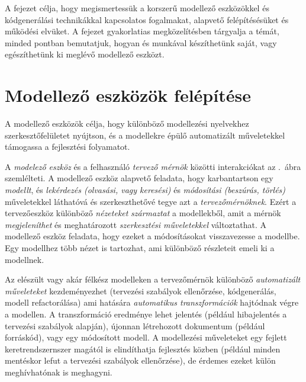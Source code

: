 \graphicspath{ {./kodgeneralas/figures/} }

A fejezet célja, hogy megismertessük a korszerű modellező eszközökkel és kódgenerálási technikákkal kapcsolatos fogalmakat, alapvető felépítésésüket és működési elvüket.
A fejezet gyakorlatias megközelítésben tárgyalja a témát, minded pontban bemutatjuk, hogyan és munkával készíthetünk saját, vagy egészíthetünk ki meglévő modellező eszközt.

\section{Modellező eszközök felépítése}
A modellező eszközök célja, hogy különböző modellezési nyelvekhez szerkesztőfelületet nyújtson, és a modellekre épülő automatizált műveletekkel támogassa a fejlesztési folyamatot.

A \emph{modelező eszköz} és a felhasználó \emph{tervező mérnök} közötti interakciókat az .~ábra szemlélteti. A modellező eszköz alapvető feladata, hogy karbantartson egy \emph{modellt}, és \emph{lekérdezés (olvasási, vagy keresési)} és \emph{módosítási (beszúrás, törlés)} műveletekkel láthatóvá és szerkeszthetővé tegye azt a \emph{tervezőmérnöknek}. Ezért a tervezőeszköz különböző \emph{nézeteket} \emph{származtat} a modellekből, amit a mérnök \emph{megjeleníthet} és meghatározott \emph{szerkesztési műveletekkel} változtathat. A modellező eszköz feladata, hogy ezeket a módosításokat visszavezesse a modellbe.
Egy modellhez több nézet is tartozhat, ami különböző részleteit emeli ki a modellnek. 

Az elészült vagy akár félkész modelleken a tervezőmérnök különböző \emph{automatizált műveleteket} kezdeményezhet (tervezési szabályok ellenőrzése, kódgenerálás, modell refactorálása) ami hatására \emph{automatikus transzformációk} hajtódnak végre a modellen. A transzformáció eredménye lehet jelentés (például hibajelentés a tervezési szabályok alapján), újonnan létrehozott dokumentum (például forráskód), vagy egy módosított modell.
A modellezési műveleteket egy fejlett keretrendszernszer magától is elindíthatja fejlesztés közben (például minden mentéskor lefut a tervezési szabályok ellenőrzése), de érdemes ezeket külön meghívhatónak is meghagyni. 

